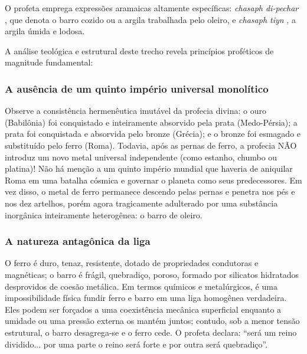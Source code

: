 \documentclass[11pt,a4paper,openany]{book}
\begin{document}
O profeta emprega expressões aramaicas altamente específicas: \textit{chasaph di-pechar} , que denota o barro cozido ou a argila trabalhada pelo oleiro, e \textit{chasaph tiyn} , a argila úmida e lodosa.

A análise teológica e estrutural deste trecho revela princípios proféticos de magnitude fundamental:


\subsubsection*{A ausência de um quinto império universal monolítico}
Observe a consistência hermenêutica imutável da profecia divina: o ouro (Babilônia) foi conquistado e inteiramente absorvido pela prata (Medo-Pérsia); a prata foi conquistada e absorvida pelo bronze (Grécia); e o bronze foi esmagado e substituído pelo ferro (Roma). Todavia, após as pernas de ferro, a profecia NÃO introduz um novo metal universal independente (como estanho, chumbo ou platina)! Não há menção a um quinto império mundial que haveria de aniquilar Roma em uma batalha cósmica e governar o planeta como seus predecessores. Em vez disso, o metal de ferro permanece descendo pelas pernas e penetra nos pés e nos dez artelhos, porém agora tragicamente adulterado por uma substância inorgânica inteiramente heterogênea: o barro de oleiro.


\subsubsection*{A natureza antagônica da liga}
O ferro é duro, tenaz, resistente, dotado de propriedades condutoras e magnéticas; o barro é frágil, quebradiço, poroso, formado por silicatos hidratados desprovidos de coesão metálica. Em termos químicos e metalúrgicos, é uma impossibilidade física fundir ferro e barro em uma liga homogênea verdadeira. Eles podem ser forçados a uma coexistência mecânica superficial enquanto a umidade ou uma pressão externa os mantém juntos; contudo, sob a menor tensão estrutural, o barro desagrega-se e o ferro cede. O profeta declara: ``será um reino dividido... por uma parte o reino será forte e por outra será quebradiço''.
\end{document}
